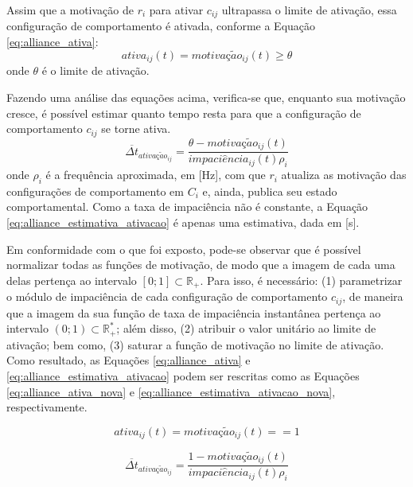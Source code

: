         Assim que a motivação de $r_i$ para ativar $c_{ij}$ ultrapassa o limite de ativação, essa configuração de comportamento é ativada, conforme a Equação \ref{eq:alliance_ativa}:
        \begin{equation} \label{eq:alliance_ativa}
            ativa_{ij}(t) = motiva\textit{ç}\tilde{a}o_{ij}(t) \geq \theta
        \end{equation}
        onde $\theta$ é o limite de ativação.
        
        Fazendo uma análise das equações acima, verifica-se que, enquanto sua motivação cresce, é possível estimar quanto tempo resta para que a configuração de comportamento $c_{ij}$ se torne ativa. 
        \begin{equation} \label{eq:alliance_estimativa_ativacao}
            \overline{\Delta t}_{ativa\textit{ç}\tilde{a}o_{ij}} = \frac{\theta - motiva\textit{ç}\tilde{a}o_{ij}(t)}{impaci\hat{e}ncia_{ij}(t) \rho_i}
        \end{equation}
        onde $\rho_i$ é a frequência aproximada, em [\si{\hertz}], com que $r_i$ atualiza as motivação das configurações de comportamento em $C_i$ e, ainda, publica seu estado comportamental. Como a taxa de impaciência não é constante, a Equação \ref{eq:alliance_estimativa_ativacao} é apenas uma estimativa, dada em [\si{\second}].
        
        Em conformidade com o que foi exposto, pode-se observar que é possível normalizar todas as funções de motivação, de modo que a imagem de cada uma delas pertença ao intervalo $[0; 1] \subset \mathbb{R}_+$. Para isso, é necessário: (1) parametrizar o módulo de impaciência de cada configuração de comportamento $c_{ij}$, de maneira que a imagem da sua função de taxa de impaciência instantânea pertença ao intervalo $(0; 1) \subset \mathbb{R}_+^*$; além disso, (2) atribuir o valor unitário ao limite de ativação; bem como, (3) saturar a função de motivação no limite de ativação. Como resultado, as Equações \ref{eq:alliance_ativa} e \ref{eq:alliance_estimativa_ativacao} podem ser rescritas como as Equações \ref{eq:alliance_ativa_nova} e \ref{eq:alliance_estimativa_ativacao_nova}, respectivamente.
        
        \begin{equation} \label{eq:alliance_ativa_nova}
            ativa_{ij}(t) = motiva\textit{ç}\tilde{a}o_{ij}(t) == 1
        \end{equation}
        
        \begin{equation} \label{eq:alliance_estimativa_ativacao_nova}
            \overline{\Delta t}_{ativa\textit{ç}\tilde{a}o_{ij}} = \frac{1 - motiva\textit{ç}\tilde{a}o_{ij}(t)}{impaci\hat{e}ncia_{ij}(t) \rho_i}
        \end{equation}
        
